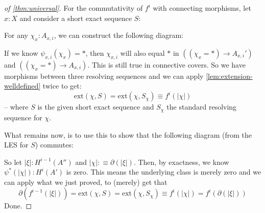 \begin{proof}[of \cref{thm:universal}]
  For the commutativity of $f^i$ with connecting morphisms, let $x:X$ and consider a short exact sequence $S$:
  \begin{center}
  \end{center}
  For any $\chi_x:A_{x,i }$, we can construct the following diagram:
  \begin{center}
  \end{center}
  If we know $\psi_{x,i}(\chi_{x})=\ast$, then $\chi_{x,i}$ will also equal $\ast$ in $\left((\chi_{x}=\ast)\to A_{x,i}'\right)$ and $\left((\chi_{x}=\ast)\to A_{x,i}\right)$.
  This is still true in connective covers.
  So we have morphisms between three resolving sequences and we
  can apply \cref{lem:extension-welldefined} twice to get:
  \[ \mathrm{ext}(\chi,S)=\mathrm{ext}(\chi,S_\chi)\equiv f^i(|\chi|)\]
  -- where $S$ is the given short exact sequence and $S_\chi$ the standard resolving sequence for $\chi$.

  What remains now, is to use this to show that the following diagram (from the LES for $S$) commutes:
  \begin{center}
  \end{center}
  So let $|\xi|:H^{i-1}(A'')$ and $|\chi|:\equiv \partial(|\xi|)$.
  Then, by exactness, we know $\psi^\ast(|\chi|):H^i(A')$ is zero.
  This means the underlying class is merely zero and we can apply what we just proved,
  to (merely) get that
  \[ \partial(f^{i-1}(|\xi|))=\mathrm{ext}(\chi,S)=\mathrm{ext}(\chi,S_\chi)\equiv f^i(|\chi|)=f^i(\partial(|\xi|))\]
  Done.
\end{proof}
